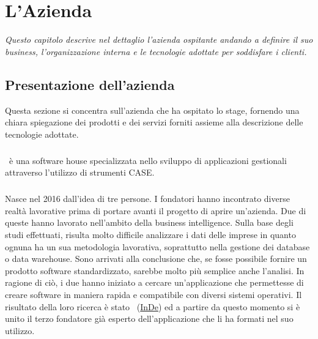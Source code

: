 

\chapter{L'Azienda}
\label{cap1:L'Azienda}
\textit{Questo capitolo descrive nel dettaglio l'azienda ospitante andando a definire il suo business, l’organizzazione interna e le tecnologie adottate per soddisfare i clienti.}

\section{Presentazione dell'azienda}
\label{cap1:Presentazione dell'azienda}
Questa sezione si concentra sull'azienda che ha ospitato lo stage, fornendo una chiara spiegazione dei prodotti e dei servizi forniti assieme alla descrizione delle tecnologie adottate.

\subsection{\azienda}
\label{cap1:Tepui}
\paragraph*{}\azienda\ è una software house specializzata nello sviluppo di applicazioni gestionali attraverso l'utilizzo di strumenti CASE. 

\paragraph*{}Nasce nel 2016 dall'idea di tre persone. I fondatori hanno incontrato diverse realtà lavorative prima di portare avanti il progetto di aprire un'azienda. Due di queste hanno lavorato nell'ambito della business intelligence. Sulla base degli studi effettuati, risulta molto difficile analizzare i dati delle imprese in quanto ognuna ha un sua metodologia lavorativa, soprattutto nella gestione dei database o data warehouse. Sono arrivati alla conclusione che, se fosse possibile fornire un prodotto software standardizzato, sarebbe molto più semplice anche l'analisi. In ragione di ciò, i due hanno iniziato a cercare un'applicazione che permettesse di creare software in maniera rapida e compatibile con diversi sistemi operativi. Il risultato della loro ricerca è stato \inde\ (\hyperref[InDe]{InDe}) ed a partire da questo momento si è unito il terzo fondatore già esperto dell'applicazione che li ha formati nel suo utilizzo.

